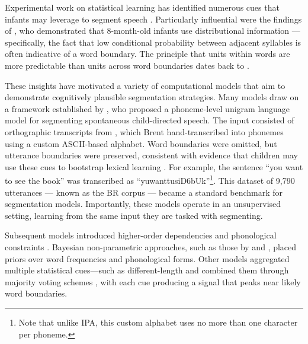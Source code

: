 Experimental work on statistical learning has identified numerous cues that infants may leverage to segment speech \citep{Cutler1987, gleitman1988learning, Jusczyk1993stress, Saffran1996distributional, Jusczyk1999allophonic, Suomi1997}. Particularly influential were the findings of \citet{Saffran1996learning}, who demonstrated that 8-month-old infants use distributional information --- specifically, the fact that low conditional probability between adjacent syllables is often indicative of a word boundary. The principle that units within words are more predictable than units across word boundaries dates back to \citet{harris1955}.

These insights have motivated a variety of computational models that aim to demonstrate cognitively plausible segmentation strategies. Many models draw on a framework established by \citet{Brent1999}, who proposed a phoneme-level unigram language model for segmenting spontaneous child-directed speech. The input consisted of orthographic transcripts from \citet{bernstein1987phonology}, which Brent hand-transcribed into phonemes using a custom ASCII-based alphabet. Word boundaries were omitted, but utterance boundaries were preserved, consistent with evidence that children may use these cues to bootstrap lexical learning \citep{aslin1996models}. For example, the sentence ``you want to see the book'' was transcribed as ``yuwanttusiD6bUk''\footnote{Note that unlike IPA, this custom alphabet uses no more than one character per phoneme.}. This dataset of 9,790 utterances --- known as the BR corpus --- became a standard benchmark for segmentation models. Importantly, these models operate in an unsupervised setting, learning from the same input they are tasked with segmenting.


Subsequent models introduced higher-order \ngram dependencies \citep{Venkataraman2001} and phonological constraints \citep{Blanchard2010}. Bayesian non-parametric approaches, such as those by \citet{Goldwater2009} and \citet{algayres_dp-parse_2022}, placed priors over word frequencies and phonological forms. Other models aggregated multiple statistical cues—such as different-length \ngrams and combined them through majority voting schemes \citep{ccoltekin2014explicit, Coltekin2017, goriely2023word}, with each cue producing a signal that peaks near likely word boundaries.

